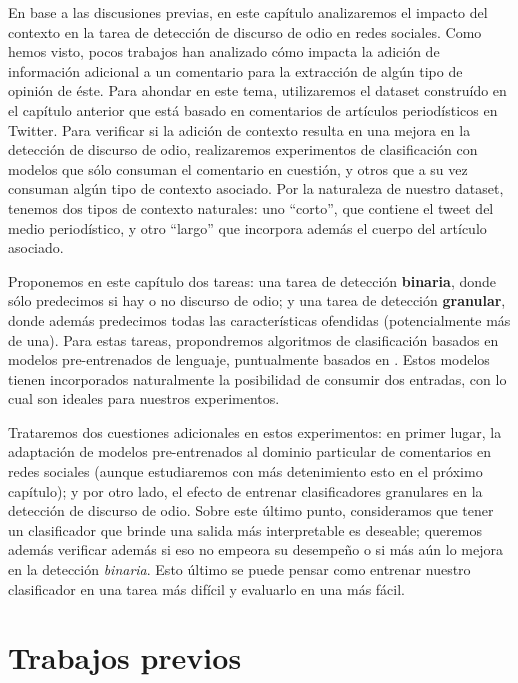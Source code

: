 \label{chap:06_contextualized_hate_speech}
En base a las discusiones previas, en este capítulo analizaremos el impacto del contexto en la tarea de detección de discurso de odio en redes sociales. Como hemos visto, pocos trabajos han analizado cómo impacta la adición de información adicional a un comentario para la extracción de algún tipo de opinión de éste. Para ahondar en este tema, utilizaremos el dataset construído en el capítulo anterior que está basado en comentarios de artículos periodísticos en Twitter. Para verificar si la adición de contexto resulta en una mejora en la detección de discurso de odio, realizaremos experimentos de clasificación con modelos que sólo consuman el comentario en cuestión, y otros que a su vez consuman algún tipo de contexto asociado. Por la naturaleza de nuestro dataset, tenemos dos tipos de contexto naturales: uno ``corto'', que contiene el tweet del medio periodístico, y otro ``largo'' que incorpora además el cuerpo del artículo asociado.

Proponemos en este capítulo dos tareas: una tarea de detección \textbf{binaria}, donde sólo predecimos si hay o no discurso de odio; y una tarea de detección \textbf{granular}, donde además predecimos todas las características ofendidas (potencialmente más de una). Para estas tareas, propondremos algoritmos de clasificación basados en modelos pre-entrenados de lenguaje, puntualmente basados en \beto{}. Estos modelos tienen incorporados naturalmente la posibilidad de consumir dos entradas, con lo cual son ideales para nuestros experimentos.

Trataremos dos cuestiones adicionales en estos experimentos: en primer lugar, la adaptación de modelos pre-entrenados al dominio particular de comentarios en redes sociales (aunque estudiaremos con más detenimiento esto en el próximo capítulo); y por otro lado, el efecto de entrenar clasificadores granulares en la detección de discurso de odio. Sobre este último punto, consideramos que tener un clasificador que brinde una salida más interpretable es deseable; queremos además verificar además si eso no empeora su desempeño o si más aún lo mejora en la detección \emph{binaria}. Esto último se puede pensar como entrenar nuestro clasificador en una tarea más difícil y evaluarlo en una más fácil.

\section{Trabajos previos}
\label{sec:06_classification_previous}

